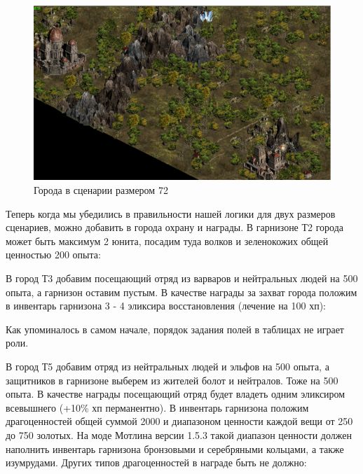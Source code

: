 \begin{figure}[H]
\center
\includegraphics[width=1.0\linewidth]{docImages/scenario72Towns.png}
\caption{Города в сценарии размером 72}
\end{figure}

Теперь когда мы убедились в правильности нашей логики для двух размеров сценариев, можно добавить в города охрану и награды. В гарнизоне Т2 города может быть максимум 2 юнита, посадим туда волков и зеленокожих общей ценностью 200 опыта:

\begin{figure}[H]

\end{figure}

В город Т3 добавим посещающий отряд из варваров и нейтральных людей на 500 опыта, а гарнизон оставим пустым. В качестве награды за захват города положим в инвентарь гарнизона 3 - 4 эликсира восстановления (лечение на 100 хп):

\begin{figure}[H]

\end{figure}

Как упоминалось в самом начале, порядок задания полей в таблицах не играет роли.

В город Т5 добавим отряд из нейтральных людей и эльфов на 500 опыта, а защитников в гарнизоне выберем из жителей болот и нейтралов. Тоже на 500 опыта. В качестве награды посещающий отряд будет владеть одним эликсиром всевышнего (+10\% хп перманентно). В инвентарь гарнизона положим драгоценностей общей суммой 2000 и диапазоном ценности каждой вещи от 250 до 750 золотых. На моде Мотлина версии 1.5.3 такой диапазон ценности должен наполнить инвентарь гарнизона бронзовыми и серебряными кольцами, а также изумрудами. Других типов драгоценностей в награде быть не должно:

